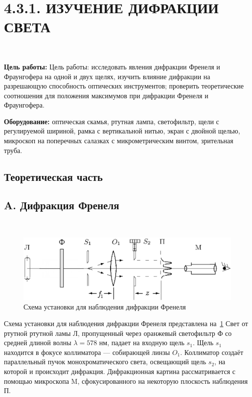 \documentclass[12pt]{article}
\begin{document}
    \section*{4.3.1. ИЗУЧЕНИЕ ДИФРАКЦИИ СВЕТА}
    \ \par
    \textbf{Цель работы:} Цель работы: исследовать явления дифракции Френеля и Фраунгофера на одной и двух
    щелях, изучить влияние дифракции на разрешающую способность оптических инструментов;
    проверить теоретические соотношения для положения максимумов при дифракции Френеля
    и Фраунгофера.

    \textbf{Оборудование:} оптическая скамья, ртутная лампа, светофильтр,
    щели с регулируемой шириной, рамка с вертикальной нитью, экран с двойной щелью,
    микроскоп на поперечных салазках с микрометрическим винтом, зрительная труба.

    \subsection*{Теоретическая часть}
    \subsection*{A. Дифракция Френеля}
    \ \par
    \begin{figure}[h]
        \centering
        \includegraphics[width=\linewidth]{pic/setupA}
        \caption{Схема установки для наблюдения дифракции Френеля}
        \label{fig:1}
    \end{figure}
    Схема установки для наблюдения дифракции Френеля представлена на\ \figurename{\ref{fig:1}} Свет
    от ртутной ртутной ламы Л, пропущенный через оранжевый светофильтр Ф со средней
    длиной волны $\lambda = 578$ нм, падает на входную щель $s_1$.
    Щель $s_1$ находится в фокусе коллиматора — собирающей линзы $O_1$.
    Коллиматор создаёт параллельный пучок монохроматического света, освещающий щель $s_2$,
    на которой и происходит дифракция.
    Дифракционная картина рассматривается с помощью микроскопа M, сфокусированного на
    некоторую плоскость наблюдения П.
\end{document}
